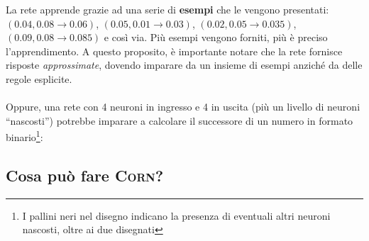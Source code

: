 \documentclass[12pt]{article}
\begin{document}
La rete apprende grazie ad una serie di \textbf{esempi} che le vengono presentati: $(0.04, 0.08 \rightarrow 0.06)$, $(0.05, 0.01 \rightarrow 0.03)$, $(0.02, 0.05 \rightarrow 0.035)$, $(0.09, 0.08 \rightarrow 0.085)$ e così via. Più esempi vengono forniti, più è preciso l'apprendimento. A questo proposito, è importante notare che la rete fornisce risposte \textit{approssimate}, dovendo imparare da un insieme di esempi anziché da delle regole esplicite.

\paragraph{} Oppure, una rete con 4 neuroni in ingresso e 4 in uscita (più un livello di neuroni “nascosti”) potrebbe imparare a calcolare il successore di un numero in formato binario\footnote{I pallini neri nel disegno indicano la presenza di eventuali altri neuroni nascosti, oltre ai due disegnati}:

\begin{center}
\end{center}

\subsection{Cosa può fare \textsc{Corn}?}
\end{document}
